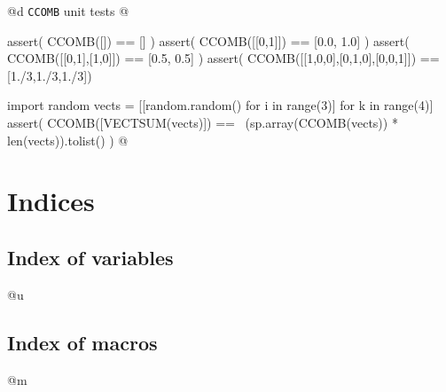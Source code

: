 \documentclass[11pt,oneside]{article}	%
\begin{document}
@d \texttt{CCOMB} unit tests
@{assert( CCOMB([]) == [] )
assert( CCOMB([[0,1]]) == [0.0, 1.0] )
assert( CCOMB([[0,1],[1,0]]) == [0.5, 0.5] )
assert( CCOMB([[1,0,0],[0,1,0],[0,0,1]]) == [1./3,1./3,1./3])

import random
vects = [[random.random() for i in range(3)] for k in range(4)]
assert( CCOMB([VECTSUM(vects)]) == \
        (sp.array(CCOMB(vects)) * len(vects)).tolist() )
@}
\section{Indices}
\subsection*{Index of variables}
@u

\subsection*{Index of macros}
@m





\end{document}
